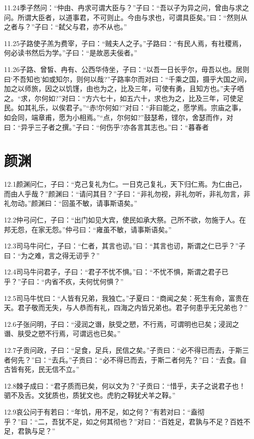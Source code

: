 \documentclass[a4paper,12pt,UTF8,twoside]{ctexbook}
\begin{document}
11.24季子然问：“仲由、冉求可谓大臣与？”子曰：“吾以子为异之问，曾由与求之问。所谓大臣者，以道事君，不可则止。今由与求也，可谓具臣矣。”曰：“然则从之者与？”子曰：“弑父与君，亦不从也。”

11.25子路使子羔为费宰，子曰：“贼夫人之子。”子路曰：“有民人焉，有社稷焉，何必读书然后为学。”子曰：“是故恶夫佞者。”

11.26子路、曾皙、冉有、公西华侍坐，子曰：“以吾一日长乎尔，毋吾以也。居则曰‘不吾知也’如或知尔，则何以哉?”子路率尔而对曰：“千乘之国，摄乎大国之间，加之以师旅，因之以饥馑，由也为之，比及三年，可使有勇，且知方也。”夫子哂之。“求，尔何如?”对曰：“方六七十，如五六十，求也为之，比及三年，可使足民。如其礼乐，以俟君子。”“赤!尔何如?”对曰：“非曰能之，愿学焉。宗庙之事，如会同，端章甫，愿为小相焉。”“点，尔何如?”鼓瑟希，铿尔，舍瑟而作，对曰：“异乎三子者之撰。”子曰：“何伤乎?亦各言其志也。”曰：“暮春者

\chapter{颜渊}
12.1颜渊问仁，子曰：“克己复礼为仁。一日克己复礼，天下归仁焉。为仁由己，而由人乎哉？”颜渊曰：“请问其目？”子曰：“非礼勿视，非礼勿听，非礼勿言，非礼勿动。”颜渊曰：“回虽不敏，请事斯语矣。”

12.2仲弓问仁，子曰：“出门如见大宾，使民如承大祭。己所不欲，勿施于人。在邦无怨，在家无怨。”仲弓曰：“雍虽不敏，请事斯语矣。”

12.3司马牛问仁，子曰：“仁者，其言也讱。”曰：“其言也讱，斯谓之仁已乎？”子曰：“为之难，言之得无讱乎？”

12.4司马牛问君子，子曰：“君子不忧不惧。”曰：“不忧不惧，斯谓之君子已乎？”子曰：“内省不疚，夫何忧何惧？”

12.5司马牛忧曰：“人皆有兄弟，我独亡。”子夏曰：“商闻之矣：死生有命，富贵在天。君子敬而无失，与人恭而有礼，四海之内皆兄弟也。君子何患乎无兄弟也？”

12.6子张问明，子曰：“浸润之谮，肤受之愬，不行焉，可谓明也已矣；浸润之谮、肤受之愬不行焉，可谓远也已矣。”

12.7子贡问政，子曰：“足食，足兵，民信之矣。”子贡曰：“必不得已而去，于斯三者何先？”曰：“去兵。”子贡曰：“必不得已而去，于斯二者何先？”曰：“去食。自古皆有死，民无信不立。”

12.8棘子成曰：“君子质而已矣，何以文为？”子贡曰：“惜乎，夫子之说君子也！驷不及舌。文犹质也，质犹文也。虎豹之鞟犹犬羊之鞟。”

12.9哀公问于有若曰：“年饥，用不足，如之何？”有若对曰：“盍彻乎？”曰：“二，吾犹不足，如之何其彻也？”对曰：“百姓足，君孰与不足？百姓不足，君孰与足？”
\end{document}
